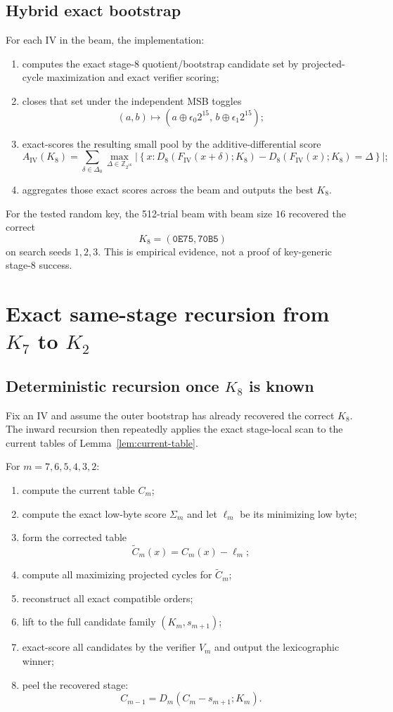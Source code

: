 \documentclass[11pt]{article}
\newcommand{\Z}[1]{\mathbb{Z}_{#1}}
\begin{document}
\subsection{Hybrid exact bootstrap}
For each IV in the beam, the implementation:
\begin{enumerate}[label=\arabic*.,leftmargin=1.5em]
\item computes the exact stage-8 quotient/bootstrap candidate set by projected-cycle maximization and exact verifier scoring;
\item closes that set under the independent MSB toggles
\[
(a,b)\mapsto (a\oplus \epsilon_0 2^{15},\, b\oplus \epsilon_1 2^{15});
\]
\item exact-scores the resulting small pool by the additive-differential score
\[
A_{\mathrm{IV}}(K_8)
=
\sum_{\delta\in\Delta_0}
\max_{\Delta\in\Z{2^{16}}}
\left|
\left\{
x : D_8(F_{\mathrm{IV}}(x+\delta);K_8)-D_8(F_{\mathrm{IV}}(x);K_8)=\Delta
\right\}
\right|;
\]
\item aggregates those exact scores across the beam and outputs the best $K_8$.
\end{enumerate}

For the tested random key, the 512-trial beam with beam size $16$ recovered the correct
\[
K_8=(\texttt{0E75},\texttt{70B5})
\]
on search seeds $1,2,3$. This is empirical evidence, not a proof of key-generic stage-8 success.

\section{Exact same-stage recursion from \texorpdfstring{$K_7$}{K7} to \texorpdfstring{$K_2$}{K2}}
\subsection{Deterministic recursion once \texorpdfstring{$K_8$}{K8} is known}
Fix an IV and assume the outer bootstrap has already recovered the correct $K_8$. The inward recursion then repeatedly applies the exact stage-local scan to the current tables of Lemma~\ref{lem:current-table}.

For $m=7,6,5,4,3,2$:
\begin{enumerate}[label=\arabic*.,leftmargin=1.5em]
\item compute the current table $C_m$;
\item compute the exact low-byte score $\Sigma_m$ and let $\ell_m$ be its minimizing low byte;
\item form the corrected table
\[
\widetilde{C}_m(x)=C_m(x)-\ell_m;
\]
\item compute all maximizing projected cycles for $\widetilde{C}_m$;
\item reconstruct all exact compatible orders;
\item lift to the full candidate family $(K_m,s_{m+1})$;
\item exact-score all candidates by the verifier $V_m$ and output the lexicographic winner;
\item peel the recovered stage:
\[
C_{m-1}=D_m(C_m-s_{m+1};K_m).
\]
\end{enumerate}
\end{document}
